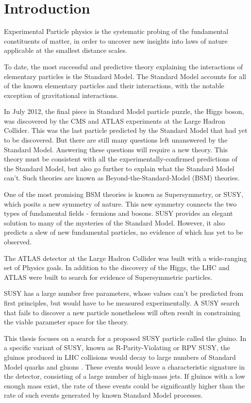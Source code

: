 \chapter{Introduction} \label{ch:intro}

Experimental Particle physics is the systematic probing of the fundamental constituents of matter,
in order to uncover new insights into laws of nature applicable at the smallest distance scales.

To date, the most successful and predictive theory explaining the interactions of elementary particles is the Standard Model.
The Standard Model accounts for all of the known elementary particles and their interactions, with the notable exception of gravitational interactions.

In July 2012, the final piece in Standard Model particle puzzle, the Higgs boson, was discovered by the CMS and ATLAS experiments at the
Large Hadron Collider.
This was the last particle predicted by the Standard Model that had yet to be discovered.
But there are still many questions left unanswered by the Standard Model.
Answering these questions will require a new theory.
This theory must be consistent with all the experimentally-confirmed predictions of the Standard Model,
but also go further to explain what the Standard Model can't.
Such theories are known as Beyond-the-Standard-Model (BSM) theories.

One of the most promising BSM theories is known as Supersymmetry, or SUSY, which posits a new symmetry of nature.
This new symmetry connects the two types of fundamental fields - fermions and bosons.
SUSY provides an elegant solution to many of the mysteries of the Standard Model.
However, it also predicts a slew of new fundamental particles, no evidence of which has yet to be observed.

The ATLAS detector at the Large Hadron Collider was built with a wide-ranging set of Physics goals.
In addition to the discovery of the Higgs, the LHC and ATLAS were built to search for evidence of Supersymmetric particles.

SUSY has a large number free parameters, whose values can't be predicted from first principles, but would have to be measured experimentally.
A SUSY search that fails to discover a new particle nonetheless will often result in constraining the viable parameter space for the theory.

This thesis focuses on a search for a proposed SUSY particle called the gluino.
In a specific variant of SUSY, known as R-Parity-Violating or RPV SUSY, the gluinos produced in LHC collisions would
decay to large numbers of Standard Model quarks and gluons .
These events would leave a characteristic signature in the detector, consisting of a large number of high-mass jets.
If gluinos with a low enough mass exist, the rate of these events could be significantly higher than the rate of such events
generated by known Standard Model processes.

